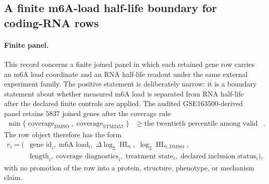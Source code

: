 
\subsection{A finite m6A-load half-life boundary for coding-RNA rows}
\label{sec:bioreality-m6a-site-load-half-life-boundary-gse163500}

\paragraph{Finite panel.}
This record concerns a finite joined panel in which each retained gene row carries an m6A load coordinate and an RNA half-life readout under the same external experiment family. The positive statement is deliberately narrow: it is a boundary statement about whether measured m6A load is separated from RNA half-life after the declared finite controls are applied. The audited GSE163500-derived panel retains $5837$ joined genes after the coverage rule
$$
\begin{aligned}
\min\{\operatorname{coverage}_{\mathrm{DMSO}},\operatorname{coverage}_{\mathrm{STM2457}}\}
&\geq \text{the twentieth percentile among valid joined genes}.
\end{aligned}
$$
The row object therefore has the form
$$
\begin{aligned}
r_i = (&\text{gene id}_i,\; \text{m6A load}_i,\; \Delta\log_2 \operatorname{HL}_i,\; \log_2 \operatorname{HL}_{i,\mathrm{DMSO}},\\
&\text{length}_i,\; \text{coverage diagnostics}_i,\; \text{treatment state}_i,\; \text{declared inclusion status}_i),
\end{aligned}
$$
with no promotion of the row into a protein, structure, phenotype, or mechanism claim.

